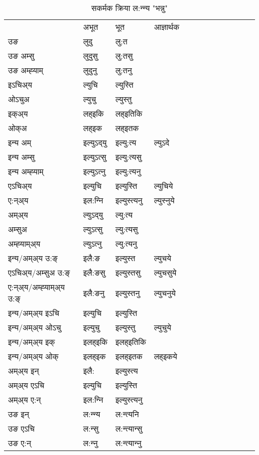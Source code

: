 \begin{table}[H]
\centering
\caption{\label{ut.vt} सकर्मक क्रिया  ल:न्‍न्य  "भन्नु"  }
\begin{tabular}{l|l|l|l|l|l|l|l|l|l|l|l|l}  \toprule
&अभूत & भूत & आज्ञार्थक \\ 
उङ &लुदु &लु:त \\ 
उङ अम्सु &लुदुसु &लु:तसु \\ 
उङ अम्ह्‍याम् &लुदुनु &लु:तनु \\ 
इऽचिअ्य &ल्युचि &ल्युस्ति   \\ 
ओऽचुअ &ल्युचु &ल्युस्तु   \\ 
इक्अ्य &लह्इकि &लह्इतिकि   \\ 
ओक्अ &लह्इक &लह्इतक   \\ 
इन्य अम् & इल्युऽद्‌यु  & इल्यु:त्य &ल्युऽदे  \\ 
इन्य अम्सु & इल्युऽत्सु  & इल्यु:त्यसु   \\ 
इन्य अम्ह्‍याम् & इल्युऽत्‍नु  & इल्यु:त्यनु   \\ 
एऽचिअ्य & इल्युचि & इल्युस्ति &ल्युचिये    \\ 
ए:न्अ्य & इल:न्‍नि  & इल्युस्त्यनु &ल्युस्‍नुये  \\ 
अम्अ्य & ल्युऽद्‌यु  & ल्यु:त्य  \\ 
अम्सुअ & ल्युऽत्सु & ल्यु:त्यसु  \\ 
अम्ह्‍याम्अ्य & ल्युऽत्‍नु  & ल्यु:त्यनु \\ 
\midrule
इन्य/अम्अ्य उ:ङ्‌&इलै:ङ & इल्युस्त &ल्युचये \\ 
एऽचिअ्य/अम्सुअ उ:ङ्‌ &इलै:ङसु & इल्युस्तसु &ल्युचसुये \\ 
ए:न्अ्य/अम्ह्‍याम्अ्य उ:ङ्‌ &इलै:ङनु & इल्युस्तनु &ल्युचनुये \\ 
इन्य/अम्अ्य इऽचि & इल्युचि & इल्युस्ति    \\ 
इन्य/अम्अ्य ओऽचु & इल्युचु & इल्युस्तु  &ल्युचुये  \\ 
इन्य/अम्अ्य इक् & इलह्इकि & इलह्इतिकि   \\ 
इन्य/अम्अ्य ओक् & इलह्इक & इलह्इतक  &लह्इकये  \\ 
अम्अ्य इन् & इलै: & इल्युस्त्य   \\ 
अम्अ्य एऽचि & इल्युचि & इल्युस्ति    \\ 
अम्अ्य ए:न् & इल:न्‍नि  & इल्युस्त्यनु  \\ 
\midrule
उङ इन् & ल:न्‍न्य  & ल:न्त्यनि  \\ 
उङ एऽचि & ल:न्सु  & ल:न्त्यान्सु   \\ 
उङ ए:न्& ल:न्‍नु  & ल:न्त्यान्‍नु   \\ 
\bottomrule
\end{tabular}
\end{table}


